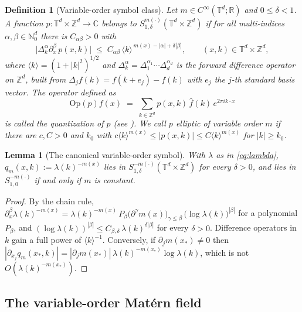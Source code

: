 \documentclass[pdflatex,sn-mathphys,Numbered]{sn-jnl}
\theoremstyle{thmstyleone}%
\newtheorem{lemma}[theorem]{Lemma}%
\theoremstyle{thmstyletwo}%
\theoremstyle{thmstylethree}%
\newtheorem{definition}[theorem]{Definition}%
\newcommand{\RR}{\mathbb{R}}
\newcommand{\CC}{\mathbb{C}}
\newcommand{\ZZ}{\mathbb{Z}}
\newcommand{\NN}{\mathbb{N}}
\newcommand{\TT}{\mathbb{T}}
\newcommand{\Op}{\mathrm{Op}}
\begin{document}
\begin{definition}[Variable-order symbol class]\label{def:varorder}
Let $m \in C^\infty(\TT^d;\RR)$ and $0 \leq \delta < 1$. A function
$p : \TT^d \times \ZZ^d \to \CC$ belongs to
$S^{m(\cdot)}_{1,\delta}(\TT^d\times\ZZ^d)$ if for all multi-indices
$\alpha,\beta \in \NN_0^d$ there is $C_{\alpha\beta}>0$ with
\[
    \bigl|\Delta_k^\alpha \partial_x^\beta\, p(x,k)\bigr|
    \;\leq\; C_{\alpha\beta}\,\langle k\rangle^{\,m(x) - |\alpha| + \delta|\beta|},
    \qquad (x,k) \in \TT^d\times\ZZ^d,
\]
where $\langle k\rangle = (1+|k|^2)^{1/2}$ and
$\Delta_k^\alpha = \Delta_1^{\alpha_1}\cdots\Delta_d^{\alpha_d}$ is the forward
difference operator on $\ZZ^d$, built from
$\Delta_j f(k) = f(k+e_j) - f(k)$ with $e_j$ the $j$-th standard basis vector.
The operator defined as
\[
    \Op(p)f(x) \;=\; \sum_{k\in\ZZ^d} p(x,k)\,\hat f(k)\, e^{2\pi i k\cdot x}
\]
is called the quantization of $p$ (see \cite{ruzhansky,ruzhansky-book}).
We call $p$ \emph{elliptic of variable order $m$} if there are $c,C>0$ and
$k_0$ with $c\langle k\rangle^{m(x)} \leq |p(x,k)| \leq C\langle k\rangle^{m(x)}$
for $|k|\geq k_0$.
\end{definition}

\begin{lemma}[The canonical variable-order symbol]\label{lem:delta-loss}
With $\lambda$ as in \eqref{eq:lambda},
$q_m(x,k) := \lambda(k)^{-m(x)}$ lies in
$S^{-m(\cdot)}_{1,\delta}(\TT^d\times\ZZ^d)$ for every $\delta>0$, and
lies in $S^{-m(\cdot)}_{1,0}$ if and only if $m$ is constant.
\end{lemma}

\begin{proof}
By the chain rule, $\partial_x^\beta \lambda(k)^{-m(x)}
= \lambda(k)^{-m(x)}\, P_\beta\!\bigl(\partial^{\gamma}m(x)\bigr)_{\gamma\leq\beta}\,
\bigl(\log \lambda(k)\bigr)^{|\beta|}$ for a polynomial $P_\beta$, and
$(\log\lambda(k))^{|\beta|} \leq C_{\beta,\delta}\,\lambda(k)^{\delta|\beta|}$
for every $\delta>0$. Difference operators in $k$ gain a full power of
$\langle k\rangle^{-1}$. Conversely, if $\partial_j m(x_*)\neq 0$ then
$|\partial_{x_j} q_m(x_*,k)| = |\partial_j m(x_*)|\,\lambda(k)^{-m(x_*)}\log\lambda(k)$,
which is not $O(\lambda(k)^{-m(x_*)})$.
\end{proof}

\subsection{The variable-order Mat\'ern field}
\end{document}
